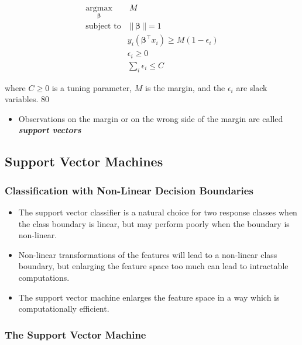 \documentclass[11pt]{article}
\providecommand{\tightlist}{%
      \setlength{\itemsep}{0pt}\setlength{\parskip}{0pt}}
\begin{document}
\begin{align*}
\underset{\boldsymbol{\beta}}{\text{argmax}}&\ M\\
\text{subject to}&\ ||\,\boldsymbol{\beta}\,|| = 1\\
& y_i(\boldsymbol{\beta}^\top x_i) \geqslant M(1-\epsilon_i)\\
& \epsilon_i \geqslant 0\\
& \sum_i \epsilon_i \leqslant C
\end{align*}

where \(C \geqslant 0\) is a tuning parameter, \(M\) is the margin, and
the \(\epsilon_i\) are slack variables. 80

\begin{itemize}
\tightlist
\item
  Observations on the margin or on the wrong side of the margin are
  called \textbf{\emph{support vectors}}
\end{itemize}

    \hypertarget{support-vector-machines}{%
\subsection{Support Vector Machines}\label{support-vector-machines}}

    \hypertarget{classification-with-non-linear-decision-boundaries}{%
\subsubsection{Classification with Non-Linear Decision
Boundaries}\label{classification-with-non-linear-decision-boundaries}}

    \begin{itemize}
\item
  The support vector classifier is a natural choice for two response
  classes when the class boundary is linear, but may perform poorly when
  the boundary is non-linear.
\item
  Non-linear transformations of the features will lead to a non-linear
  class boundary, but enlarging the feature space too much can lead to
  intractable computations.
\item
  The support vector machine enlarges the feature space in a way which
  is computationally efficient.
\end{itemize}

    \hypertarget{the-support-vector-machine}{%
\subsubsection{The Support Vector
Machine}\label{the-support-vector-machine}}
\end{document}
